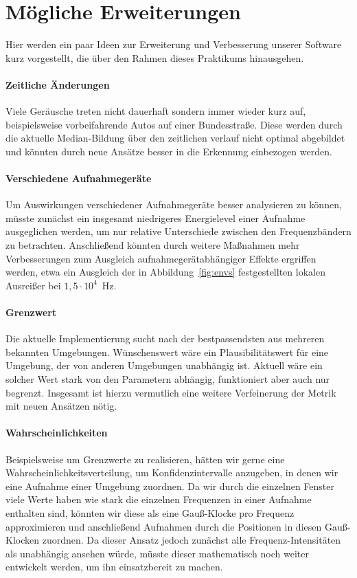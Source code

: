 \documentclass[
	fontsize=10.5pt,
	marginpar=false,
	ngerman,
	accentcolor=3d
	]{tudapub}
\begin{document}
\pagebreak
\section{Mögliche Erweiterungen}
\label{future}

Hier werden ein paar Ideen zur Erweiterung und Verbesserung unserer Software kurz vorgestellt, die über den Rahmen dieses Praktikums hinausgehen.

\paragraph{Zeitliche Änderungen}
Viele Geräusche treten nicht dauerhaft sondern immer wieder kurz auf, beispielsweise vorbeifahrende Autos auf einer Bundesstraße. Diese werden durch die aktuelle Median-Bildung über den zeitlichen verlauf nicht optimal abgebildet und könnten durch neue Ansätze besser in die Erkennung einbezogen werden.

\paragraph{Verschiedene Aufnahmegeräte}
Um Auswirkungen verschiedener Aufnahmegeräte besser analysieren zu können, müsste zunächst ein insgesamt niedrigeres Energielevel einer Aufnahme ausgeglichen werden, um nur relative Unterschiede zwischen den Frequenzbändern zu betrachten. Anschließend könnten durch weitere Maßnahmen mehr Verbesserungen zum Ausgleich aufnahmegerätabhängiger Effekte ergriffen werden, etwa ein Ausgleich der in Abbildung~\ref{fig:envs} festgestellten lokalen Ausreißer bei $1,5\cdot10^4$~Hz.

\paragraph{Grenzwert}
Die aktuelle Implementierung sucht nach der bestpassendsten aus mehreren bekannten Umgebungen. Wünschenswert wäre ein Plausibilitätswert für eine Umgebung, der von anderen Umgebungen unabhängig ist. Aktuell wäre ein solcher Wert stark von den Parametern abhängig, funktioniert aber auch nur begrenzt. Insgesamt ist hierzu vermutlich eine weitere Verfeinerung der Metrik mit neuen Ansätzen nötig.

\paragraph{Wahrscheinlichkeiten}
Beispielsweise um Grenzwerte zu realisieren, hätten wir gerne eine Wahrscheinlichkeitsverteilung, um Konfidenzintervalle anzugeben, in denen wir eine Aufnahme einer Umgebung zuordnen. Da wir durch die einzelnen Fenster viele Werte haben wie stark die einzelnen Frequenzen in einer Aufnahme enthalten sind, könnten wir diese als eine Gauß-Klocke pro Frequenz approximieren und anschließend Aufnahmen durch die Positionen in diesen Gauß-Klocken zuordnen. Da dieser Ansatz jedoch zunächst alle Frequenz-Intensitäten als unabhängig ansehen würde, müsste dieser mathematisch noch weiter entwickelt werden, um ihn einsatzbereit zu machen.
\end{document}
